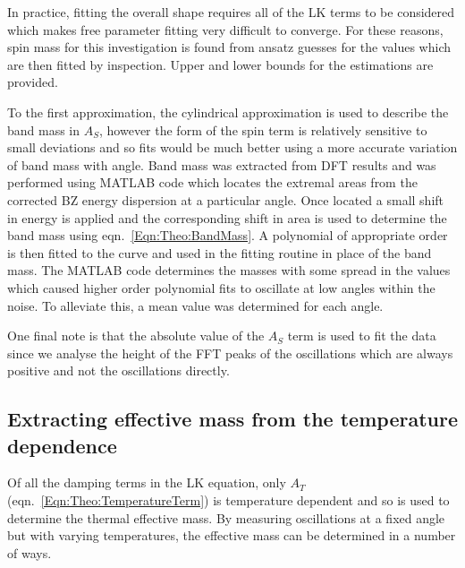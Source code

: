 
In practice, fitting the overall shape requires all of the \ac{LK} terms to be considered which makes free parameter fitting very difficult to converge. For these reasons, spin mass for this investigation is found from ansatz guesses for the values which are then fitted by inspection. Upper and lower bounds for the estimations are provided.

To the first approximation, the cylindrical approximation is used to describe the band mass in $A_S$, however the form of the spin term is relatively sensitive to small deviations and so fits would be much better using a more accurate variation of band mass with angle. Band mass was extracted from \ac{DFT} results and was performed using MATLAB code which locates the extremal areas from the corrected \ac{BZ} energy dispersion at a particular angle. Once located a small shift in energy is applied and the corresponding shift in area is used to determine the band mass using eqn.~\ref{Eqn:Theo:BandMass}. A polynomial of appropriate order is then fitted to the curve and used in the fitting routine in place of the band mass. The MATLAB code determines the masses with some spread in the values which caused higher order polynomial fits to oscillate at low angles within the noise. To alleviate this, a mean value was determined for each angle.

One final note is that the absolute value of the $A_S$ term is used to fit the data since we analyse the height of the \ac{FFT} peaks of the oscillations which are always positive and not the oscillations directly.

\subsection{Extracting effective mass from the temperature dependence}
\label{Sec:Exp:ExtractingEffMassTemperatureDependence}

Of all the damping terms in the \ac{LK} equation, only $A_T$ (eqn.~\ref{Eqn:Theo:TemperatureTerm}) is temperature dependent and so is used to determine the thermal effective mass. By measuring oscillations at a fixed angle but with varying temperatures, the effective mass can be determined in a number of ways.

